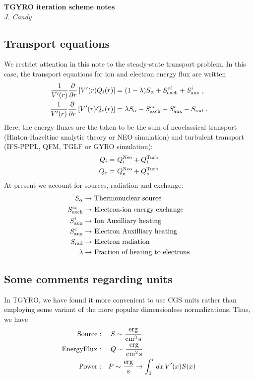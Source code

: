\documentclass[12pt]{article}
\newcommand\vpr{V^\prime}
\begin{document}
\begin{center}
{\bf TGYRO iteration scheme notes}\\
{\sl J. Candy}
\end{center}

\subsection{Transport equations}

We restrict attention in this note to the steady-state transport 
problem.  In this case, the transport equations for ion and 
electron energy flux are written
%
\begin{align}
\frac{1}{\vpr(r)} \frac{\partial}{\partial r} \left[ 
\vpr(r) Q_i(r) \right] = &~(1-\lambda) S_\alpha + S_{\rm exch}^{ei} 
  + S_{\rm aux}^i \; , \\ 
\frac{1}{\vpr(r)} \frac{\partial}{\partial r} \left[ 
\vpr(r) Q_e(r) \right] = &~\lambda S_\alpha - S_{\rm exch}^{ei} 
 + S_{\rm aux}^e - S_{\rm rad} \; . 
\end{align}
%
Here, the energy fluxes are the taken to be the sum of neoclassical 
transport (Hinton-Hazeltine analytic theory or NEO simulation) and 
turbulent transport (IFS-PPPL, QFM, TGLF or GYRO simulation):
%
\begin{align}
Q_i = & ~Q_i^{\rm Neo} + Q_i^{\rm Turb} \\ 
Q_e = & ~Q_e^{\rm Neo} + Q_e^{\rm Turb} 
\end{align}
%
At present we account for sources, radiation and exchange:
%
\begin{align*}
S_\alpha \rightarrow &~\text{Thermonuclear source} \\
S_{\rm exch}^{ei} \rightarrow &~\text{Electron-ion energy exchange} \\
S_{\rm aux}^i \rightarrow &~\text{Ion Auxilliary heating} \\
S_{\rm aux}^e \rightarrow &~\text{Electron Auxilliary heating} \\
S_{\rm rad} \rightarrow &~\text{Electron radiation} \\
\lambda \rightarrow &~\text{Fraction of heating to electrons}
\end{align*}
% 
\subsection{Some comments regarding units}

In TGYRO, we have found it more convenient to use CGS units
rather than employing some variant of the more popular 
dimensionless normalizations.  Thus, we have
%
\begin{align}
{\rm Source}: \quad &~ S \sim \frac{{\rm erg}}{{\rm cm}^3 \, {\rm s}} \\
{\rm Energy Flux}: \quad &~ Q \sim \frac{{\rm erg}}{{\rm cm}^2 \, {\rm s}} \\
{\rm Power}: \quad & P \sim  \frac{{\rm erg}}{{\rm s}} \rightarrow 
  \int_0^r dx \, V^\prime(x) S(x) 
\end{align}
\end{document}

